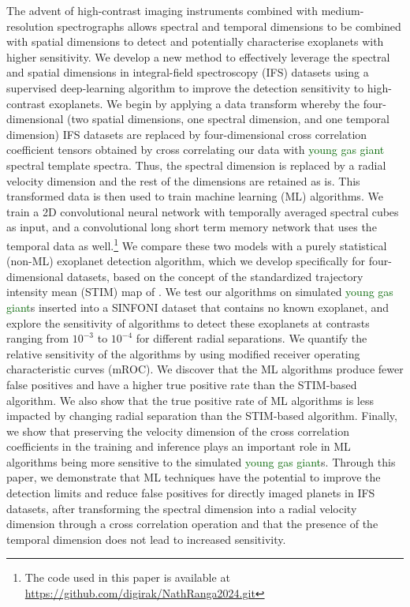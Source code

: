 \documentclass[referee]{aa} %
\newcommand{\newchange}[1]{\textcolor{darkgreen}{#1}}
\begin{document}
  \abstract
  {The advent of high-contrast imaging instruments combined with medium-resolution spectrographs allows spectral and temporal dimensions to be combined with spatial dimensions to detect and potentially characterise exoplanets with higher sensitivity.}
  {We develop a new method to effectively leverage the spectral and spatial dimensions in integral-field spectroscopy (IFS) datasets using a supervised deep-learning algorithm to improve the detection sensitivity to high-contrast exoplanets.}
  {We begin by applying a data transform whereby the four-dimensional (two spatial dimensions, one spectral dimension, and one temporal dimension) IFS datasets are replaced by four-dimensional cross correlation coefficient tensors obtained by cross correlating our data with \newchange{young gas giant} spectral template spectra.
  Thus, the spectral dimension is replaced by a radial velocity dimension and the rest of the dimensions are retained as is.
  This transformed data is then used to train machine learning (ML) algorithms.
  We train a 2D convolutional neural network 
  with temporally averaged spectral cubes as input, and a convolutional long short term memory network that uses the temporal data as well.\footnote{The code used in this paper is available at \url{https://github.com/digirak/NathRanga2024.git}}
  We compare these two models with a purely statistical (non-ML) exoplanet detection algorithm, which we develop specifically for four-dimensional datasets, based on the concept of the standardized trajectory intensity mean (STIM) map of \citet{2019Pairet}.
  We test our algorithms on simulated \newchange{young gas giant}s inserted into a SINFONI dataset that contains no known exoplanet, and explore the sensitivity of algorithms to detect these exoplanets at contrasts ranging from $10^{-3}$ to $10^{-4}$ for different radial separations.
  }
  {We quantify the relative sensitivity of the algorithms by using modified receiver operating characteristic curves (mROC).
  We discover that the ML algorithms produce fewer false positives and have a higher true positive rate than the STIM-based algorithm.
  We also show that the true positive rate of ML algorithms is less impacted by changing radial separation than the STIM-based algorithm.
  Finally, we show that preserving the velocity dimension of the cross correlation coefficients in the training and inference plays an important role in ML algorithms being more sensitive to the simulated \newchange{young gas giant}s.}
  {Through this paper, we demonstrate that ML techniques have the potential to improve the detection limits and reduce false positives for directly imaged planets in IFS datasets, after transforming the spectral dimension into a radial velocity dimension through a cross correlation operation and that the presence of the temporal dimension does not lead to increased sensitivity.
  }
   
\end{document}
